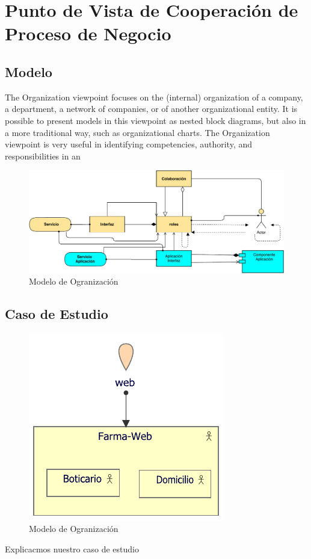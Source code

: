 \section{Punto de Vista de Cooperación de Proceso de Negocio}
\subsection{Modelo}
The Organization viewpoint focuses on the (internal) organization of a company, a department, a network of companies, or of another organizational entity. It is possible to present models in this viewpoint as nested block diagrams, but also in a more traditional way, such as organizational charts. The Organization viewpoint is very useful in identifying competencies, authority, and responsibilities in an

\begin{figure}[h!]
	\centering
	\includegraphics[width=1\linewidth]{ARQUITECTURA/imgs/MOrganizacion}
	\caption{Modelo de Ogranización}
\end{figure}


\newpage
\subsection{Caso de Estudio}

\begin{figure}[h!]
	\centering
	\includegraphics[width=.5\linewidth]{ARQUITECTURA/imgs/COrganizacion}
	\caption{Modelo de Ogranización}
\end{figure}
Explicacmos nuestro caso de estudio
\newpage


